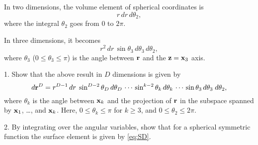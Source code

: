 \documentclass{book}
\begin{document}



In two dimensions, the volume element of spherical coordinates is
\[
  r \, dr \, d\theta_2,
\]
where the integral $\theta_2$ goes from $0$ to $2\pi$.

In three dimensions, it becomes
\[
  r^2 \, dr \,
  \sin \theta_3 \, d \theta_3 \,
  d \theta_2,
\]
where $\theta_3$ ($0 \le \theta_3 \le \pi$)
is the angle between $\boldsymbol{\mathbf{r}}$ and the $\boldsymbol{\mathbf{z}} = \boldsymbol{\mathbf{x}}_3$ axis.

1. Show that the above result in $D$ dimensions is given by
\begin{equation}
  d\boldsymbol{\mathbf{r}}^{D}
=
  r^{D-1} \, dr \;
  \sin^{D-2} \theta_D \, d \theta_D \,
  \cdots \,
  \sin^{k-2} \theta_k \, d \theta_k \,
  \cdots \,
  \sin \theta_3 \, d \theta_3 \;
  d \theta_2,
  \label{eq:sphrcoordiff}
\end{equation}
where $\theta_k$ is the angle between $\boldsymbol{\mathbf{x}}_k$ and
the projection of $\boldsymbol{\mathbf{r}}$ in the subspace
spanned by $\boldsymbol{\mathbf{x}}_1$, \dots, and $\boldsymbol{\mathbf{x}}_k$.
Here, $0 \le \theta_k \le \pi$ for $k \ge 3$,
and $0 \le \theta_2 \le 2\pi$.


2. By integrating over the angular variables,
show that for a spherical symmetric function
the surface element is given by \eqref{eq:SD}.
\end{document}
